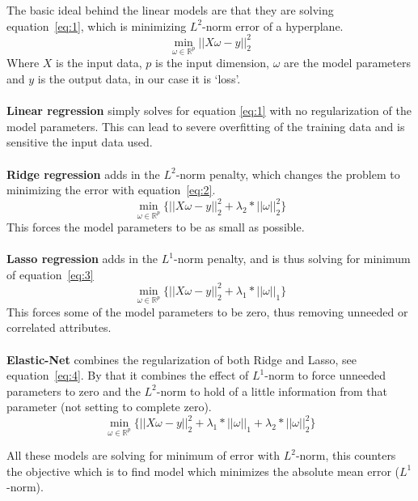 \documentclass[a4paper]{article}
\begin{document}
The basic ideal behind the linear models are that they are solving equation~\ref{eq:1}, which is minimizing $L^2$-norm error of a hyperplane.  
\begin{equation} \label{eq:1}
\min_{\omega\in\mathbb{R}^p}||X\omega - y||_2^2
\end{equation}
Where $X$ is the input data, $p$ is the input dimension, $\omega$ are the model parameters and $y$ is the output data, in our case it is ‘loss’. \\\\
\textbf{Linear regression} simply solves for equation \ref{eq:1} with no regularization of the model parameters. This can lead to severe overfitting of the training data and is sensitive the input data used. \\\\
\textbf{Ridge regression} adds in the $L^2$-norm penalty, which changes the problem to minimizing the error with equation~\ref{eq:2}.
\begin{equation} \label{eq:2}
\min_{\omega\in\mathbb{R}^p} \{||X\omega - y||_2^2 + \lambda_2*||\omega||_2^2 \}
\end{equation}
This forces the model parameters to be as small as possible.\\\\
\textbf{Lasso regression} adds in the $L^1$-norm penalty, and is thus solving for minimum of equation~\ref{eq:3}
\begin{equation} \label{eq:3}
\min_{\omega\in\mathbb{R}^p}  \{||X\omega - y||_2^2 + \lambda_1*||\omega||_1\}
\end{equation}
This forces some of the model parameters to be zero, thus removing unneeded or correlated attributes. \\\\
\textbf{Elastic-Net} combines the regularization of both Ridge and Lasso, see equation~\ref{eq:4}. By that it combines the effect of $L^1$-norm to force unneeded parameters to zero and the $L^2$-norm to hold of a little information from that parameter (not setting to complete zero).
\begin{equation} \label{eq:4}
\min_{\omega\in\mathbb{R}^p}  \{||X\omega - y||_2^2 + \lambda_1*||\omega||_1 + \lambda_2*||\omega||_2^2\}
\end{equation}

All these models are solving for minimum of error with $L^2$-norm, this counters the objective which is to find model which minimizes the absolute mean error ($L^1$-norm).
\end{document}
